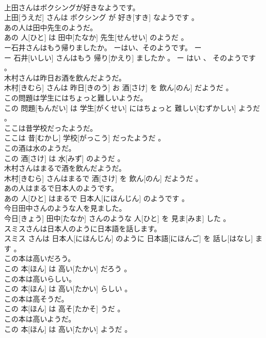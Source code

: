 \documentclass[8pt]{extreport}
\begin{document}
\begin{CJK}{UTF8}{min}
\\	上田さんはボクシングが好きなようです。	
\\	上田[うえだ] さんは ボクシング が 好き[すき] なようです 。
\\	あの人は田中先生のようだ。	
\\	あの 人[ひと] は 田中[たなか] 先生[せんせい] のようだ 。
\\	ー石井さんはもう帰りましたか。 ーはい、そのようです。	ー
\\	ー 石井[いしい] さんはもう 帰り[かえり] ましたか 。 ー はい 、 そのようです 。
\\	木村さんは昨日お酒を飲んだようだ。	
\\	木村[きむら] さんは 昨日[きのう] お 酒[さけ] を 飲ん[のん] だようだ 。
\\	この問題は学生にはちょっと難しいようだ。	
\\	この 問題[もんだい] は 学生[がくせい] にはちょっと 難しい[むずかしい] ようだ 。
\\	ここは昔学校だったようだ。	
\\	ここは 昔[むかし] 学校[がっこう] だったようだ 。
\\	この酒は水のようだ。	
\\	この 酒[さけ] は 水[みず] のようだ 。
\\	木村さんはまるで酒を飲んだようだ。	
\\	木村[きむら] さんはまるで 酒[さけ] を 飲ん[のん] だようだ 。
\\	あの人はまるで日本人のようです。	
\\	あの 人[ひと] はまるで 日本人[にほんじん] のようです 。
\\	今日田中さんのような人を見ました。	
\\	今日[きょう] 田中[たなか] さんのような 人[ひと] を 見ま[みま] した 。
\\	スミスさんは日本人のように日本語を話します。	
\\	スミス さんは 日本人[にほんじん] のように 日本語[にほんご] を 話し[はなし] ます 。
\\	この本は高いだろう。	
\\	この 本[ほん] は 高い[たかい] だろう 。
\\	この本は高いらしい。	
\\	この 本[ほん] は 高い[たかい] らしい 。
\\	この本は高そうだ。	
\\	この 本[ほん] は 高そ[たかそ] うだ 。
\\	この本は高いようだ。	
\\	この 本[ほん] は 高い[たかい] ようだ 。

\end{CJK}
\end{document}
